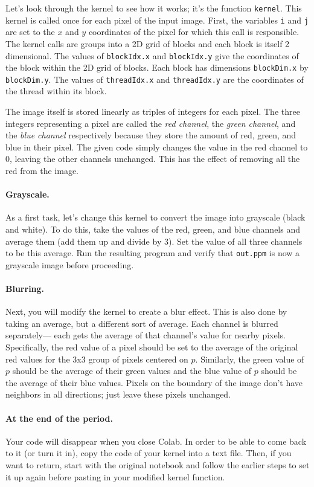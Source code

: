 \documentclass{article}
\begin{document}
Let's look through the kernel to see how it works; it's the function
{\tt kernel}.
This kernel is called once for each pixel of the input image.
First, the variables {\tt i} and {\tt j} are set to the $x$ and $y$
coordinates of the pixel for which this call is
responsible.
The kernel calls are groups into a 2D grid of blocks and each block
is itself 2 dimensional.
The values of {\tt blockIdx.x} and {\tt blockIdx.y} give the
coordinates of the block within the 2D grid of blocks.
Each block has dimensions {\tt blockDim.x} by {\tt blockDim.y}.
The values of {\tt threadIdx.x} and {\tt threadIdx.y} are the
coordinates of the thread within its block. 

The image itself is stored linearly as triples of integers for each
pixel.
The three integers representing a pixel are called the {\em red channel}, the
{\em green channel}, and the {\em blue channel} respectively because
they store the amount of red, green, and blue in their pixel.
The given code simply changes the value in the red channel to 0,
leaving the other channels unchanged.
This has the effect of removing all the red from the image. 

\paragraph{Grayscale.}
As a first task, let's change this kernel to convert the image into
grayscale (black and white).
To do this, take the values of the red, green, and blue channels and
average them (add them up and divide by 3).
Set the value of all three channels to be this average.
Run the resulting program and verify that {\tt out.ppm} is now a
grayscale image before proceeding.

\paragraph{Blurring.}
Next, you will modify the kernel to create a blur effect.
This is also done by taking an average, but a different sort of average.
Each channel is blurred separately--- each gets the average of that
channel’s value for nearby pixels.
Specifically, the red value of a pixel should be set to the average of
the original red values for the 3x3 group of pixels centered on $p$.
Similarly, the green value of $p$ should be the average of their green
values and the blue value of $p$ should be the average of their blue
values.
Pixels on the boundary of the image don't have neighbors in all
directions; just leave these pixels unchanged.

\paragraph{At the end of the period.}
Your code will disappear when you close Colab.
In order to be able to come back to it (or turn it in), copy the code
of your kernel into a text file.
Then, if you want to return, start with the original notebook and
follow the earlier steps to set it up again before pasting in your
modified kernel function. 
\end{document}
